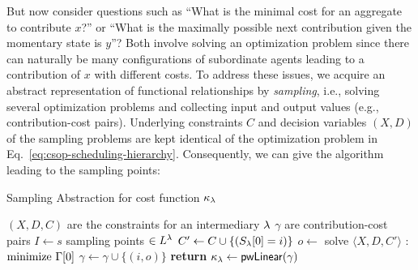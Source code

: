\documentclass[conference]{IEEEtran}
\newcommand{\eref}[1]{Eq.~\ref{#1}}
\begin{document}
But now consider questions such as ``What is the minimal cost for an aggregate to contribute
$x$?'' or ``What is the maximally possible next contribution given the momentary state is $y$''? Both 
involve solving an optimization problem since there can naturally be many configurations
of subordinate agents leading to a contribution of $x$ with different costs. To address these issues,
we acquire an abstract representation of functional relationships by \emph{sampling}, i.e., solving 
several optimization problems and collecting input and output values (e.g., contribution-cost pairs). 
Underlying constraints $C$ and decision variables $(X, D)$ 
of the sampling problems are kept identical of the optimization problem in \eref{eq:csop-scheduling-hierarchy}.
Consequently, we can give the algorithm leading to the sampling points:
%
\begin{algorithm}
\caption{Sampling Abstraction for cost function $\kappa_\lambda$}\label{alg:SamplingAbstraction}
\begin{algorithmic}[1]
\Require $(X, D, C)$ are the constraints for an intermediary $\lambda$
\Ensure $\gamma$ are contribution-cost pairs 
\State $I \gets s$ sampling points $\in L^\lambda$ 
\State $C' \gets C \cup \{(S_{\lambda}[0] = i)\}$
\State $o \gets $ solve $\langle X, D, C'\rangle$ : $\text{minimize } \Gamma[0]$
\State $\gamma \gets \gamma \cup \{(i,o)\}$
\EndFor
\State \textbf{return} $\kappa_\lambda \gets \mathsf{pwLinear}(\gamma)$ 
\EndProcedure
\end{algorithmic}
\end{algorithm}
%
\end{document}
